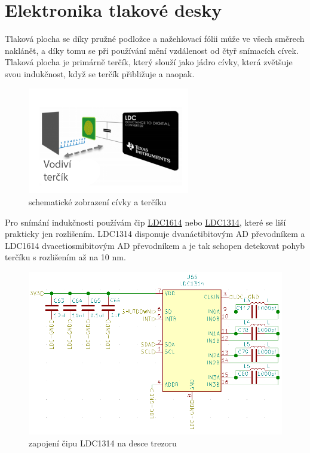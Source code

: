 \section{Elektronika tlakové desky}


Tlaková plocha se díky pružné podložce a nažehlovací fólii může ve všech směrech naklánět, a díky tomu se při používání mění vzdálenost od čtyř snímacích
cívek. Tlaková plocha je primárně terčík, který slouží jako jádro cívky, která zvětšuje svou indukčnost, když se terčík přibližuje a naopak.

\begin{figure}[htbp] %
    \centering
    \includegraphics[width=200pt]{kapitoly/obrazky/E4/elektronika_tlakove_desky/civka_tercik_LDC.png}
    \caption{schematické zobrazení cívky a terčíku}
    \label{fig:E4-sch_civka_tercik}
\end{figure}

Pro snímání indukčnosti používám čip \href{https://www.ti.com/lit/ds/symlink/ldc1612.pdf?ts=1612018658531&ref_url=https%253A%252F%252Fwww.google.com%252F}{LDC1614}
nebo \href{https://www.ti.com/lit/ds/symlink/ldc1312.pdf?ts=1612017390818&ref_url=https%253A%252F%252Fwww.google.com%252F}{LDC1314}, 
které se liší prakticky jen rozlišením. LDC1314 disponuje dvanáctibitovým AD převodníkem a LDC1614 dvacetiosmibitovým AD převodníkem 
a je tak schopen detekovat pohyb terčíku s rozlišením až na 10 nm.

\begin{figure}[htbp]
    \centering
    \includegraphics[width=\textwidth]{kapitoly/obrazky/E4/elektronika_tlakove_desky/moje_zapojeni.png}
    \caption{zapojení čipu LDC1314 na desce trezoru}
    \label{fig:E4-LDC}
\end{figure}

